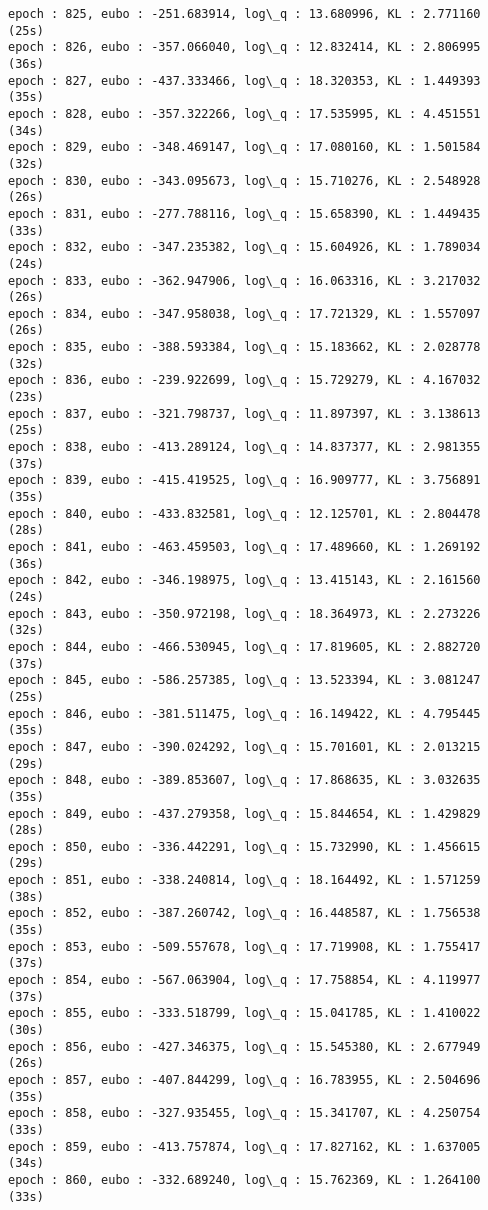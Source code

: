 \documentclass[11pt]{article}
\begin{document}
\begin{Verbatim}[commandchars=\\\{\}]
epoch : 825, eubo : -251.683914, log\_q : 13.680996, KL : 2.771160 (25s)
epoch : 826, eubo : -357.066040, log\_q : 12.832414, KL : 2.806995 (36s)
epoch : 827, eubo : -437.333466, log\_q : 18.320353, KL : 1.449393 (35s)
epoch : 828, eubo : -357.322266, log\_q : 17.535995, KL : 4.451551 (34s)
epoch : 829, eubo : -348.469147, log\_q : 17.080160, KL : 1.501584 (32s)
epoch : 830, eubo : -343.095673, log\_q : 15.710276, KL : 2.548928 (26s)
epoch : 831, eubo : -277.788116, log\_q : 15.658390, KL : 1.449435 (33s)
epoch : 832, eubo : -347.235382, log\_q : 15.604926, KL : 1.789034 (24s)
epoch : 833, eubo : -362.947906, log\_q : 16.063316, KL : 3.217032 (26s)
epoch : 834, eubo : -347.958038, log\_q : 17.721329, KL : 1.557097 (26s)
epoch : 835, eubo : -388.593384, log\_q : 15.183662, KL : 2.028778 (32s)
epoch : 836, eubo : -239.922699, log\_q : 15.729279, KL : 4.167032 (23s)
epoch : 837, eubo : -321.798737, log\_q : 11.897397, KL : 3.138613 (25s)
epoch : 838, eubo : -413.289124, log\_q : 14.837377, KL : 2.981355 (37s)
epoch : 839, eubo : -415.419525, log\_q : 16.909777, KL : 3.756891 (35s)
epoch : 840, eubo : -433.832581, log\_q : 12.125701, KL : 2.804478 (28s)
epoch : 841, eubo : -463.459503, log\_q : 17.489660, KL : 1.269192 (36s)
epoch : 842, eubo : -346.198975, log\_q : 13.415143, KL : 2.161560 (24s)
epoch : 843, eubo : -350.972198, log\_q : 18.364973, KL : 2.273226 (32s)
epoch : 844, eubo : -466.530945, log\_q : 17.819605, KL : 2.882720 (37s)
epoch : 845, eubo : -586.257385, log\_q : 13.523394, KL : 3.081247 (25s)
epoch : 846, eubo : -381.511475, log\_q : 16.149422, KL : 4.795445 (35s)
epoch : 847, eubo : -390.024292, log\_q : 15.701601, KL : 2.013215 (29s)
epoch : 848, eubo : -389.853607, log\_q : 17.868635, KL : 3.032635 (35s)
epoch : 849, eubo : -437.279358, log\_q : 15.844654, KL : 1.429829 (28s)
epoch : 850, eubo : -336.442291, log\_q : 15.732990, KL : 1.456615 (29s)
epoch : 851, eubo : -338.240814, log\_q : 18.164492, KL : 1.571259 (38s)
epoch : 852, eubo : -387.260742, log\_q : 16.448587, KL : 1.756538 (35s)
epoch : 853, eubo : -509.557678, log\_q : 17.719908, KL : 1.755417 (37s)
epoch : 854, eubo : -567.063904, log\_q : 17.758854, KL : 4.119977 (37s)
epoch : 855, eubo : -333.518799, log\_q : 15.041785, KL : 1.410022 (30s)
epoch : 856, eubo : -427.346375, log\_q : 15.545380, KL : 2.677949 (26s)
epoch : 857, eubo : -407.844299, log\_q : 16.783955, KL : 2.504696 (35s)
epoch : 858, eubo : -327.935455, log\_q : 15.341707, KL : 4.250754 (33s)
epoch : 859, eubo : -413.757874, log\_q : 17.827162, KL : 1.637005 (34s)
epoch : 860, eubo : -332.689240, log\_q : 15.762369, KL : 1.264100 (33s)

\end{Verbatim}
\end{document}
